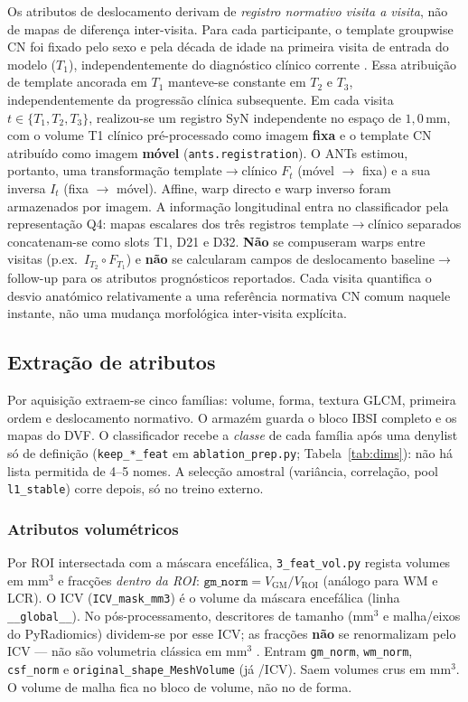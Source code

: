 \documentclass[review]{elsarticle}
\newcommand{\code}[1]{\texttt{#1}}
\begin{document}
		Os atributos de deslocamento derivam de \emph{registro normativo visita a visita}, não de mapas de diferença inter-visita. Para cada participante, o template groupwise CN foi fixado pelo sexo e pela década de idade na primeira visita de entrada do modelo ($T_1$), independentemente do diagnóstico clínico corrente \cite{wyman-2013}. Essa atribuição de template ancorada em $T_1$ manteve-se constante em $T_2$ e $T_3$, independentemente da progressão clínica subsequente.
		Em cada visita $t \in \{T_1,T_2,T_3\}$, realizou-se um registro SyN independente no espaço de $1{,}0$\,mm, com o volume T1 clínico pré-processado como imagem \textbf{fixa} e o template CN atribuído como imagem \textbf{móvel} (\code{ants.registration}). O ANTs estimou, portanto, uma transformação template$\to$clínico $F_t$ (móvel $\rightarrow$ fixa) e a sua inversa $I_t$ (fixa $\rightarrow$ móvel). Affine, warp directo e warp inverso foram armazenados por imagem.
		A informação longitudinal entra no classificador pela representação Q4: mapas escalares dos três registros template$\to$clínico separados concatenam-se como slots T1, D21 e D32.
		\textbf{Não} se compuseram warps entre visitas (p.ex.\ $I_{T_2}\circ F_{T_1}$) e \textbf{não} se calcularam campos de deslocamento baseline$\to$follow-up para os atributos prognósticos reportados.
		Cada visita quantifica o desvio anatómico relativamente a uma referência normativa CN comum naquele instante, não uma mudança morfológica inter-visita explícita.


	\subsection{Extração de atributos}\label{sec:feature-extraction}

		Por aquisição extraem-se cinco famílias: volume, forma, textura GLCM, primeira ordem e deslocamento normativo.
		O armazém guarda o bloco IBSI completo e os mapas do DVF.
		O classificador recebe a \emph{classe} de cada família após uma denylist só de definição (\code{keep\_*\_feat} em \code{ablation\_prep.py}; Tabela~\ref{tab:dims}): não há lista permitida de 4--5 nomes.
		A selecção amostral (variância, correlação, pool \code{l1\_stable}) corre depois, só no treino externo.

		\subsubsection{Atributos volumétricos}\label{subsubsec:feat_vol}

			Por ROI intersectada com a máscara encefálica, \code{3\_feat\_vol.py} regista volumes em mm$^3$ e fracções \emph{dentro da ROI}: $\mathtt{gm\_norm}=V_{\mathrm{GM}}/V_{\mathrm{ROI}}$ (análogo para WM e LCR).
			O ICV (\code{ICV\_mask\_mm3}) é o volume da máscara encefálica (linha \code{\_\_global\_\_}).
			No pós-processamento, descritores de tamanho (mm$^3$ e malha/eixos do PyRadiomics) dividem-se por esse ICV; as fracções \textbf{não} se renormalizam pelo ICV --- não são volumetria clássica em mm$^3$ \cite{wyman-2013}.
			Entram \code{gm\_norm}, \code{wm\_norm}, \code{csf\_norm} e \code{original\_shape\_MeshVolume} (já /ICV).
			Saem volumes crus em mm$^3$.
			O volume de malha fica no bloco de volume, não no de forma.
\end{document}
